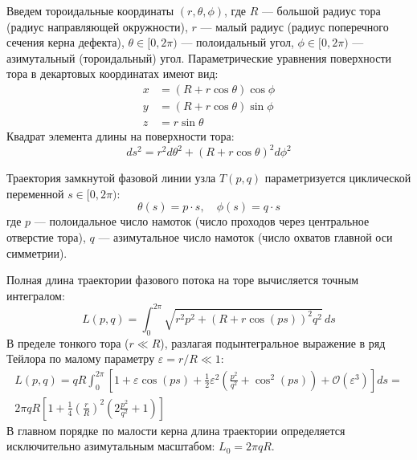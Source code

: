 \documentclass[12pt,a4paper]{article}
\begin{document}
	Введем тороидальные координаты $(r, \theta, \phi)$, где $R$ — большой радиус тора (радиус направляющей окружности), $r$ — малый радиус (радиус поперечного сечения керна дефекта), $\theta \in [0, 2\pi)$ — полоидальный угол, $\phi \in [0, 2\pi)$ — азимутальный (тороидальный) угол. Параметрические уравнения поверхности тора в декартовых координатах имеют вид:
	\begin{align}
		x &= (R + r \cos\theta) \cos\phi \\
		y &= (R + r \cos\theta) \sin\phi \\
		z &= r \sin\theta
	\end{align}
	Квадрат элемента длины на поверхности тора:
	\begin{equation}
		ds^2 = r^2 d\theta^2 + (R + r \cos\theta)^2 d\phi^2
	\end{equation}
	
	Траектория замкнутой фазовой линии узла $T(p,q)$ параметризуется циклической переменной $s \in [0, 2\pi)$:
	\begin{equation}
		\theta(s) = p \cdot s, \quad \phi(s) = q \cdot s
	\end{equation}
	где $p$ — полоидальное число намоток (число проходов через центральное отверстие тора), $q$ — азимутальное число намоток (число охватов главной оси симметрии). 
	
	Полная длина траектории фазового потока на торе вычисляется точным интегралом:
	\begin{equation}
		L(p,q) = \int_0^{2\pi} \sqrt{r^2 p^2 + (R + r \cos(ps))^2 q^2} \, ds
	\end{equation}
	В пределе тонкого тора ($r \ll R$), разлагая подынтегральное выражение в ряд Тейлора по малому параметру $\varepsilon = r/R \ll 1$:
	\begin{equation}
	\begin{split}
		L(p,q) = q R \int_0^{2\pi} \left[ 1 + \varepsilon \cos(ps) + \frac{1}{2} \varepsilon^2 \left( \frac{p^2}{q^2} + \cos^2(ps) \right) + \mathcal{O}(\varepsilon^3) \right] ds = \\
		2\pi q R \left[ 1 + \frac{1}{4} \left(\frac{r}{R}\right)^2 \left( 2\frac{p^2}{q^2} + 1 \right) \right]
	\end{split}
	\end{equation}
	В главном порядке по малости керна длина траектории определяется исключительно азимутальным масштабом: $L_0 = 2\pi q R$.
	
\end{document}

